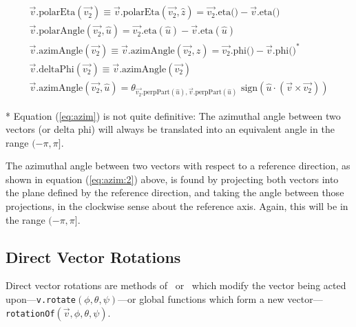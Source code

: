 \begin{eqnarray}
    \label{eq:polarA} \\
  \vec{v}\mbox{.polarEta} (\vec{v_2})
    \equiv \vec{v}\mbox{.polarEta} (\vec{v_2}, \hat{z}) =
    \vec{v_2}\mbox{.eta()} - \vec{v}\mbox{.eta()}
    \label{eq:polarEta} \\
  \vec{v}\mbox{.polarAngle} (\vec{v_2}, \hat{u}) =
    \vec{v_2}\mbox{.eta}(\hat{u}) - \vec{v}\mbox{.eta}(\hat{u})
    \label{eq:polarA:2} \\
  \vec{v}\mbox{.azimAngle} (\vec{v_2})
    \equiv \vec{v}\mbox{.azimAngle} (\vec{v_2}, \hat{z}) =
    \vec{v_2}\mbox{.phi()} - \vec{v}\mbox{.phi()} ^*
    \label{eq:azim} \\
  \vec{v}\mbox{.deltaPhi} (\vec{v_2})
    \equiv \vec{v}\mbox{.azimAngle} (\vec{v_2}) 
    \label{eq:deltaPhi} \\
  \vec{v}\mbox{.azimAngle} (\vec{v_2}, \hat{u}) =
    \theta_{\vec{v_2}\mbox{.perpPart}(\hat{u}),
    \vec{v}\mbox{.perpPart}(\hat{u})}
    \mbox{ sign} \left( \hat{u} \cdot (\vec{v} \times \vec{v_2}) \right)
    \label{eq:azim:2}
\end{eqnarray}

\noindent

* Equation (\ref{eq:azim}) is not quite definitive:  
The azimuthal angle between two vectors (or delta phi)
will always be translated into an 
equivalent angle in the range $(-\pi,\pi]$.

The azimuthal angle between two vectors with respect to a reference direction,
as shown in equation (\ref{eq:azim:2}) above, is found by
projecting both vectors into the plane defined by the reference direction,
and taking the angle between those projections, in the clockwise sense about
the reference axis.  Again, this will be in the range $(-\pi,\pi]$.

\subsection{Direct Vector Rotations}
\label{rotations}

Direct vector rotations are methods of \SV\ or \LV\ which
modify the vector being acted
upon---{\tt v.rotate}$(\phi, \theta, \psi)$---or
global functions which form a new
vector---{\tt rotationOf}$(\vec{v}, \phi, \theta, \psi)$.

